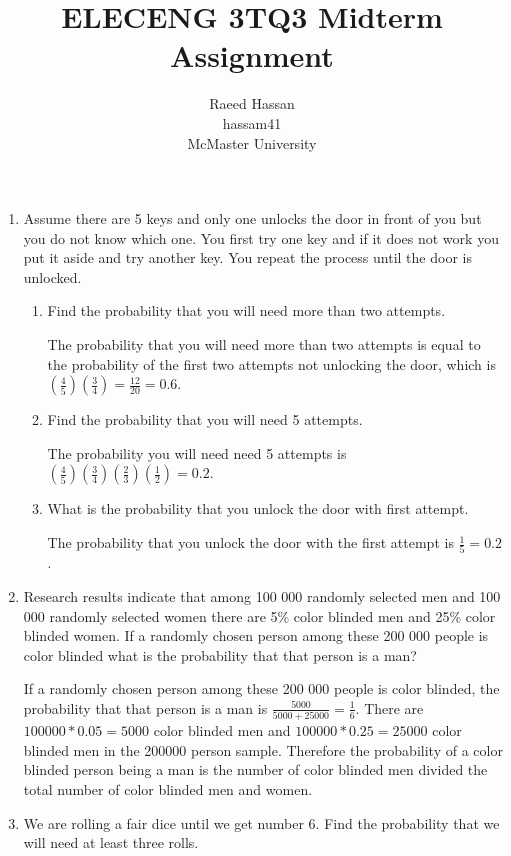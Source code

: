 \documentclass[12pt]{article}
\title{ELECENG 3TQ3 Midterm Assignment}
\author{Raeed Hassan \\ hassam41 \\ McMaster University}
\begin{document}
\maketitle
\pagebreak
\begin{enumerate}
    \item Assume there are 5 keys and only one unlocks the door in front of you but you do not know which one. You first try one key and if it does not work you put it aside and try another key. You repeat the process until the door is unlocked.
    \begin{enumerate}
        \item Find the probability that you will need more than two attempts.
        
        The probability that you will need more than two attempts is equal to the probability of the first two attempts not unlocking the door, which is $(\frac{4}{5})(\frac{3}{4}) = \frac{12}{20} = 0.6$.

        \item Find the probability that you will need 5 attempts.
        
        The probability you will need need 5 attempts is $(\frac{4}{5})(\frac{3}{4})(\frac{2}{3})(\frac{1}{2}) = 0.2$.

        \item What is the probability that you unlock the door with first attempt.

        The probability that you unlock the door with the first attempt is $\frac{1}{5} = 0.2$.
    \end{enumerate}

    \item Research results indicate that among 100 000 randomly selected men and 100 000 randomly selected women there are 5\% color blinded men and 25\% color blinded women. If a randomly chosen person among these 200 000 people is color blinded what is the probability that that person is a man?

    If a randomly chosen person among these 200 000 people is color blinded, the probability that that person is a man is $\frac{5000}{5000+25000} = \frac{1}{6}$. There are $100000 * 0.05 = 5000$ color blinded men and $100000 * 0.25 = 25000$ color blinded men in the 200000 person sample. Therefore the probability of a color blinded person being a man is the number of color blinded men divided the total number of color blinded men and women.
    
    \item We are rolling a fair dice until we get number 6. Find the probability that we will need at least three rolls.


\end{enumerate}
\end{document}
